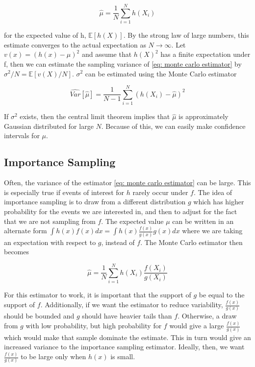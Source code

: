 \begin{equation}
\hat{\mu} = \frac{1}{N} \sum_{i=1}^N h(X_i)
\label{eq: monte carlo estimator}    
\end{equation}
  
for the expected value of h, $\mathbb{E}[h(X)]$. By the strong law of large numbers, this estimate converges to the actual expectation as $N\rightarrow\infty$. Let $v(x) = (h(x) - {\mu})^2$ and assume that $h(X)^2$ has a finite expectation under f, then we can estimate the sampling variance of \eqref{eq: monte carlo estimator} by $\sigma^2/N = \mathbb{E}[v(X)/N]$. $\sigma^2$ can be estimated using the Monte Carlo estimator

\begin{equation}
    \widehat{Var}[\hat{\mu}] = \frac{1}{N-1}\sum_{i=1}^N (h(X_i) - \hat{\mu})^2
\end{equation}

If $\sigma^2$ exists, then the central limit theorem implies that $\hat{\mu}$ is approximately Gaussian distributed for large $N$. Because of this, we can easily make confidence intervals for $\mu$\parencite{givens2013computational}.


\subsection{Importance Sampling}
\label{subsec: importance sampling theory}
Often, the variance of the estimator \eqref{eq: monte carlo estimator} can be large. This is especially true if events of interest for $h$ rarely occur under $f$. The idea of importance sampling is to draw from a different distribution $g$ which has higher probability for the events we are interested in, and then to adjust for the fact that we are not sampling from $f$. The expected value $\mu$ can be written in an alternate form $\int h(x)f(x)dx = \int h(x)\frac{f(x)}{g(x)}g(x) dx$ where we are taking an expectation with respect to $g$, instead of $f$. The Monte Carlo estimator then becomes

\begin{equation}
    \hat{\mu} = \frac{1}{N} \sum_{i=1}^N h(X_i)\frac{f(X_i)}{g(X_i)}
\end{equation}

For this estimator to work, it is important that the support of $g$ be equal to the support of $f$. Additionally, if we want the estimator to reduce variability, $\frac{f(x)}{g(x)}$ should be bounded and $g$ should have heavier tails than $f$. Otherwise, a draw from $g$ with low probability, but high probability for $f$ would give a large $\frac{f(x)}{g(x)}$ which would make that sample dominate the estimate. This in turn would give an increased variance to the importance sampling estimator. Ideally, then, we want $\frac{f(x)}{g(x)}$ to be large only when $h(x)$ is small. \parencite{givens2013computational}






